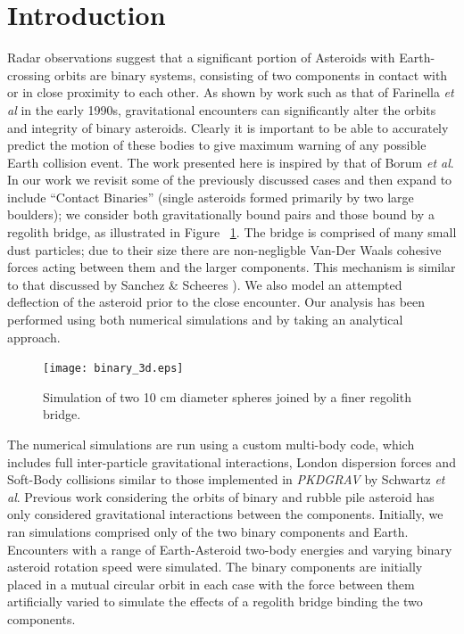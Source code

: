 \documentclass[letterpaper, preprint, paper,11pt]{AAS}	%
\begin{document}
\section{Introduction}
Radar observations suggest that a significant portion of Asteroids with Earth-crossing orbits are binary systems, consisting of two components in contact with or in close proximity to each other. As shown by work such as that of Farinella \textit{et al} \cite{binaryevo} in the early 1990s, gravitational encounters can significantly alter the orbits and integrity of binary asteroids. Clearly it is important to be able to accurately predict the motion of these bodies to give maximum warning of any possible Earth collision event. The work presented here is inspired by that of Borum \textit{et al}\cite{exchange}. In our work we revisit some of the previously discussed cases and then expand to include “Contact Binaries” (single asteroids formed primarily by two large boulders); we consider both gravitationally bound pairs and those bound by a regolith bridge, as illustrated in Figure ~\ref{fig:Pic}. The bridge is comprised of many small dust particles; due to their size there are non-negligble Van-Der Waals cohesive forces acting between them and the larger components. This mechanism is similar to that discussed by Sanchez \& Scheeres \cite{dustbound}). We also model an attempted deflection of the asteroid prior to the close encounter. Our analysis has been performed using both numerical simulations and by taking an analytical approach.
\begin{figure}[H]
\centering
\texttt{[image: binary\_3d.eps]} 
\caption{Simulation of two 10 cm diameter spheres joined by a finer regolith bridge.} 
\label{fig:Pic}
\end{figure} 
The numerical simulations are run using a custom multi-body code, which includes full inter-particle gravitational interactions, London dispersion forces and Soft-Body collisions similar to those implemented in \textit{PKDGRAV} by Schwartz \textit{et al}\cite{soft}.
Previous work considering the orbits of binary and rubble pile asteroid has only considered gravitational interactions between the components. 
Initially, we ran simulations comprised only of the two binary components and Earth. Encounters with a range of Earth-Asteroid two-body energies and varying binary asteroid rotation speed were simulated. The binary components are initially placed in a mutual circular orbit in each case with the force between them artificially varied to simulate the effects of a regolith bridge binding the two components.
\end{document}

